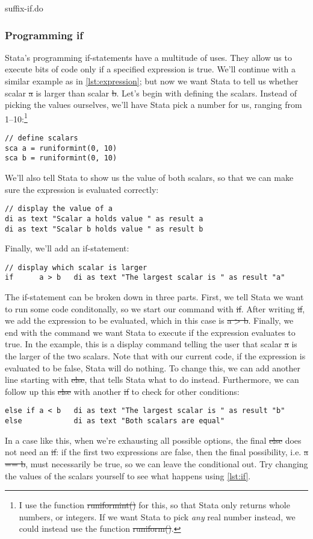 \begin{listing}[tbp]
\caption{suffix-if.do}\label{lst:suffix}
\end{listing}

\subsubsection{Programming if}
Stata's programming if-statements have a multitude of uses.
They allow us to execute bits of code only if a specified expression is true.
We'll continue with a similar example as in \cref{lst:expression};
but now we want Stata to tell us whether scalar \st{a} is larger than scalar \st{b}.
Let's begin with defining the scalars.
Instead of picking the values ourselves,
we'll have Stata pick a number for us, ranging from 1--10:\footnote{%
I use the function \st{runiformint()} for this,
so that Stata only returns whole numbers, or integers.
If we want Stata to pick \emph{any} real number instead,
we could instead use the function \st{runiform()}.}
\begin{verbatim}
// define scalars
sca a = runiformint(0, 10)
sca b = runiformint(0, 10)
\end{verbatim}
We'll also tell Stata to show us the value of both scalars,
so that we can make sure the expression is evaluated correctly:
\begin{verbatim}
// display the value of a
di as text "Scalar a holds value " as result a
di as text "Scalar b holds value " as result b
\end{verbatim}
Finally, we'll add an if-statement:
\begin{verbatim}
// display which scalar is larger
if      a > b   di as text "The largest scalar is " as result "a"
\end{verbatim}

The if-statement can be broken down in three parts.
First, we tell Stata we want to run some code conditonally,
so we start our command with \st{if}.
After writing \st{if}, we add the expression to be evaluated,
which in this case is \st{a > b}.
Finally, we end with the command we want Stata to execute if the expression evaluates to true.
In the example,
this is a display command telling the user that scalar \st{a} is the larger of the two scalars.
Note that with our current code,
if the expression is evaluated to be false,
Stata will do nothing.
To change this,
we can add another line starting with \st{else},
that tells Stata what to do instead.
Furthermore,
we can follow up this \st{else} with another \st{if} to check for other conditions:
\begin{verbatim}
else if a < b   di as text "The largest scalar is " as result "b"
else            di as text "Both scalars are equal"
\end{verbatim}
In a case like this, when we're exhausting all possible options,
the final \st{else} does not need an \st{if}:
if the first two expressions are false,
then the final possibility, i.e. \st{a == b}, must necessarily be true,
so we can leave the conditional out.
Try changing the values of the scalars yourself to see what happens using \cref{lst:if}.

